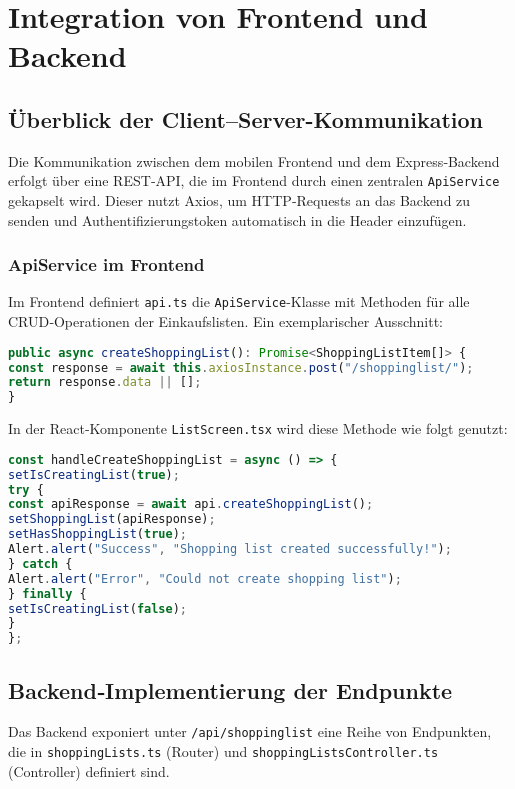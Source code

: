 \chapter{Integration von Frontend und Backend}
\renewcommand{\authorinitials}{DH}

\label{chap:integration}

\section{Überblick der Client–Server-Kommunikation}
Die Kommunikation zwischen dem mobilen Frontend und dem Express‑Backend erfolgt über eine REST‑API, die im Frontend durch einen zentralen \texttt{ApiService} gekapselt wird. Dieser nutzt Axios, um HTTP‑Requests an das Backend zu senden und Authentifizierungs­token automatisch in die Header einzufügen.

\subsection{ApiService im Frontend}
Im Frontend definiert \texttt{api.ts} die \texttt{ApiService}-Klasse mit Methoden für alle CRUD‑Operationen der Einkaufslisten. Ein exemplarischer Ausschnitt:

\begin{lstlisting}[language=TypeScript,caption={Definition der \texttt{createShoppingList}-Methode im \texttt{ApiService}}]
public async createShoppingList(): Promise<ShoppingListItem[]> {
const response = await this.axiosInstance.post("/shoppinglist/");
return response.data || [];
}
\end{lstlisting}

In der React‑Komponente \texttt{ListScreen.tsx} wird diese Methode wie folgt genutzt:

\begin{lstlisting}[language=TypeScript,caption={Aufruf von \texttt{createShoppingList} im Frontend}]
const handleCreateShoppingList = async () => {
setIsCreatingList(true);
try {
const apiResponse = await api.createShoppingList();
setShoppingList(apiResponse);
setHasShoppingList(true);
Alert.alert("Success", "Shopping list created successfully!");
} catch {
Alert.alert("Error", "Could not create shopping list");
} finally {
setIsCreatingList(false);
}
};
\end{lstlisting}

\section{Backend‑Implementierung der Endpunkte}
Das Backend exponiert unter \texttt{/api/shoppinglist} eine Reihe von Endpunkten, die in \texttt{shoppingLists.ts} (Router) und \texttt{shoppingListsController.ts} (Controller) definiert sind.

